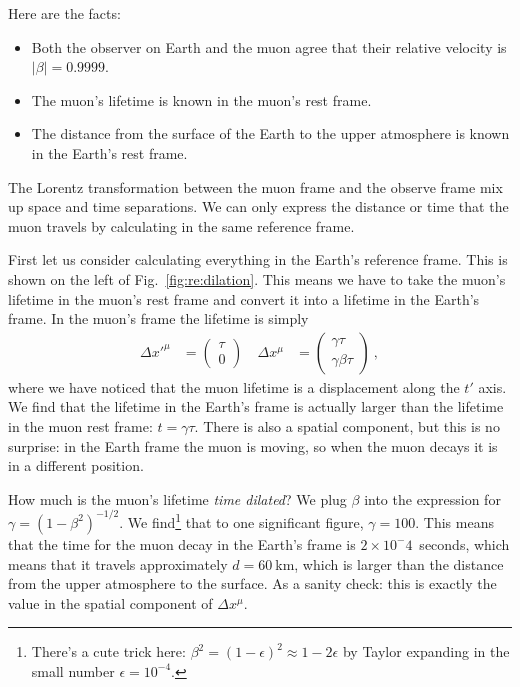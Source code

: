 \documentclass[12pt, oneside]{report}    %
\begin{document}
Here are the facts:
\begin{itemize}
    \item Both the observer on Earth and the muon agree that their relative velocity is $|\beta| = 0.9999$. 
    \item The muon's lifetime is known in the muon's rest frame. 
    \item The distance from the surface of the Earth to the upper atmosphere is known in the Earth's rest frame. 
\end{itemize}
The Lorentz transformation between the muon frame and the observe frame mix up space and time separations. We can only express the distance or time that the muon travels by calculating in the same reference frame. 


First let us consider calculating everything in the Earth's reference frame. This is shown on the left of Fig.~\ref{fig:re:dilation}. This means we have to take the muon's lifetime in the muon's rest frame and convert it into a lifetime in the Earth's frame. In the muon's frame the lifetime is simply 
\begin{align}
    \Delta x'^\mu &= 
    \begin{pmatrix}
    \tau \\ 0     
    \end{pmatrix} \ 
    &
    \Delta x^\mu &=
    \begin{pmatrix}
    \gamma \tau \\ \gamma\beta \tau    
    \end{pmatrix} \ ,
\end{align}
where we have noticed that the muon lifetime is a displacement along the $t'$ axis. We find that the lifetime in the Earth's frame is actually larger than the lifetime in the muon rest frame: $t = \gamma \tau$. There is also a spatial component, but this is no surprise: in the Earth frame the muon is moving, so when the muon decays it is in a different position. 

How much is the muon's lifetime \emph{time dilated}? We plug $\beta$ into the expression for $\gamma = (1-\beta^2)^{-1/2}$. We find\footnote{There's a cute trick here: $\beta^2 = (1-\epsilon)^2 \approx 1- 2\epsilon$ by Taylor expanding in the small number $\epsilon = 10^{-4}$.} that to one significant figure, $\gamma = 100$. This means that the time for the muon decay in the Earth's frame is $2\times 10^-4$~seconds, which means that it travels approximately $d=60~$km, which is larger than the distance from the upper atmosphere to the surface. As a sanity check: this is exactly the value in the spatial component of $\Delta x^\mu$.
\end{document}
